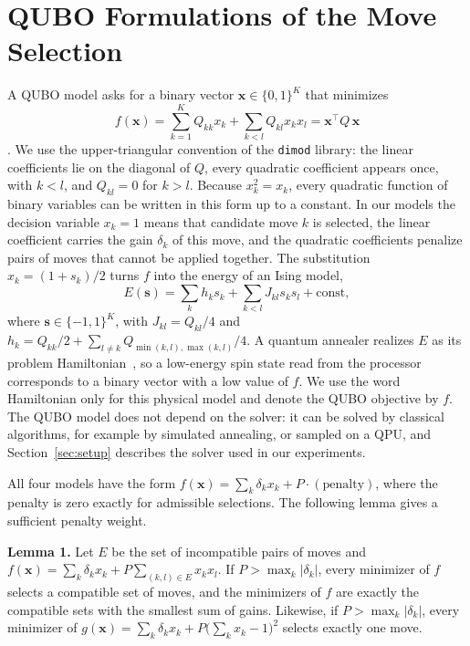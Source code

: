 \documentclass[10pt,twoside,twocolumn,a4paper]{article}
\newif\ifrevmarks \revmarksfalse
\newcommand{\rev}[1]{\ifrevmarks\textcolor{red}{#1}\else#1\fi}
\newenvironment{revblock}{\ifrevmarks\color{red}\fi}{}
\begin{document}
\section{\rev{QUBO Formulations of the Move Selection}}\label{sec:qubo}
\begin{revblock}
A QUBO model asks for a binary vector $\mathbf{x}\in\{0,1\}^K$ that minimizes
\begin{equation}
f(\mathbf{x})=\sum_{k=1}^{K}Q_{kk}x_k+\sum_{k<l}Q_{kl}x_kx_l=\mathbf{x}^\top Q\,\mathbf{x}
\end{equation}
\cite{Glover2019}. We use the upper-triangular convention of the \texttt{dimod} library: the linear coefficients lie on the diagonal of $Q$, every quadratic coefficient appears once, with $k<l$, and $Q_{kl}=0$ for $k>l$. Because $x_k^2=x_k$, every quadratic function of binary variables can be written in this form up to a constant. In our models the decision variable $x_k=1$ means that candidate move $k$ is selected, the linear coefficient carries the gain $\delta_k$ of this move, and the quadratic coefficients penalize pairs of moves that cannot be applied together. The substitution $x_k=(1+s_k)/2$ turns $f$ into the energy of an Ising model,
\begin{equation}
E(\mathbf{s})=\sum_k h_ks_k+\sum_{k<l}J_{kl}s_ks_l+\text{const},
\end{equation}
where $\mathbf{s}\in\{-1,1\}^K$, with $J_{kl}=Q_{kl}/4$ and $h_k=Q_{kk}/2+\sum_{l\ne k}Q_{\min(k,l),\max(k,l)}/4$. A quantum annealer realizes $E$ as its problem Hamiltonian~\cite{Kadowaki1998,Johnson2011}, so a low-energy spin state read from the processor corresponds to a binary vector with a low value of $f$. We use the word Hamiltonian only for this physical model and denote the QUBO objective by $f$. The QUBO model does not depend on the solver: it can be solved by classical algorithms, for example by simulated annealing, or sampled on a QPU, and Section~\ref{sec:setup} describes the solver used in our experiments.

All four models have the form $f(\mathbf{x})=\sum_k\delta_kx_k+P\cdot(\text{penalty})$, where the penalty is zero exactly for admissible selections. The following lemma gives a sufficient penalty weight.

\textbf{Lemma 1.} Let $E$ be the set of incompatible pairs of moves and $f(\mathbf{x})=\sum_k\delta_kx_k+P\sum_{(k,l)\in E}x_kx_l$. If $P>\max_k|\delta_k|$, every minimizer of $f$ selects a compatible set of moves, and the minimizers of $f$ are exactly the compatible sets with the smallest sum of gains. Likewise, if $P>\max_k|\delta_k|$, every minimizer of $g(\mathbf{x})=\sum_k\delta_kx_k+P\bigl(\sum_kx_k-1\bigr)^2$ selects exactly one move.


\end{revblock}
\end{document}
